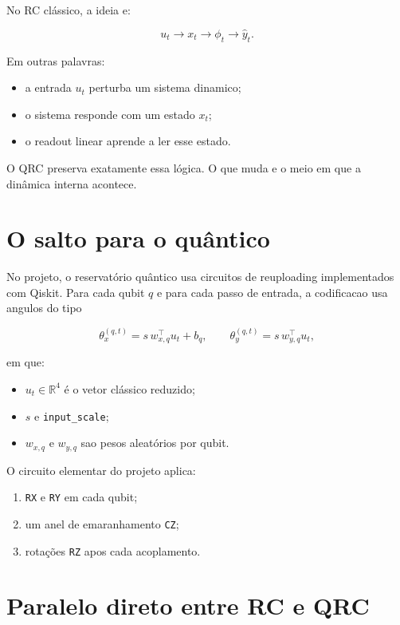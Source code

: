 \documentclass[12pt]{article}
\providecommand{\tightlist}{%
              \setlength{\itemsep}{0pt}\setlength{\parskip}{0pt}}
\begin{document}
No RC clássico, a ideia e:

\[
u_t \longrightarrow x_t \longrightarrow \phi_t \longrightarrow \hat{y}_t.
\]

Em outras palavras:

\begin{itemize}
\tightlist
\item
  a entrada \(u_t\) perturba um sistema dinamico;
\item
  o sistema responde com um estado \(x_t\);
\item
  o readout linear aprende a ler esse estado.
\end{itemize}

O QRC preserva exatamente essa lógica. O que muda e o meio em que a dinâmica interna acontece.

\section{O salto para o quântico}\label{3-o-salto-para-o-quuxe2ntico}

No projeto, o reservatório quântico usa circuitos de reuploading implementados com Qiskit. Para cada qubit \(q\) e para cada passo de entrada, a codificacao usa angulos do tipo

\[
\theta^{(q,t)}_x = s \, w_{x,q}^\top u_t + b_q,
\qquad
\theta^{(q,t)}_y = s \, w_{y,q}^\top u_t,
\]

em que:

\begin{itemize}
\tightlist
\item
  \(u_t \in \mathbb{R}^4\) é o vetor clássico reduzido;
\item
  \(s\) e \texttt{input\_scale};
\item
  \(w_{x,q}\) e \(w_{y,q}\) sao pesos aleatórios por qubit.
\end{itemize}

O circuito elementar do projeto aplica:

\begin{enumerate}
\def\labelenumi{\arabic{enumi}.}
\tightlist
\item
  \texttt{RX} e \texttt{RY} em cada qubit;
\item
  um anel de emaranhamento \texttt{CZ};
\item
  rotações \texttt{RZ} apos cada acoplamento.
\end{enumerate}

\section{Paralelo direto entre RC e QRC}\label{4-paralelo-direto-entre-rc-e-qrc}
\end{document}
